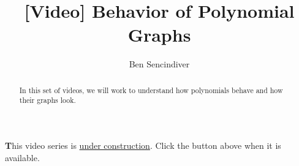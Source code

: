 \documentclass{ximera}
\title[Prerequisite Videos: ]{[Video] Behavior of Polynomial Graphs}
\author{Ben Sencindiver}
\begin{document}
\begin{abstract}
   In this set of videos, we will work to understand how 
   polynomials behave and how their graphs look.  
\end{abstract}
\maketitle



{\textbf This video series is \underline{under construction}. Click the  button above when it is available}.
\end{document}
